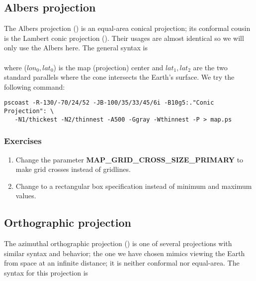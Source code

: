 \documentclass{report}
\begin{document}
\subsection{Albers projection}

The Albers projection () is an equal-area conical projection;
its conformal cousin is the Lambert conic projection ().
Their usages are almost identical so we will only use the Albers here.
The general syntax is \\

 \\

\noindent
where ($lon_0, lat_0$) is the map (projection) center and $lat_1, lat_2$
are the two standard parallels where the cone intersects the Earth's surface.
We try the following command:

{\small\begin{verbatim}
pscoast -R-130/-70/24/52 -JB-100/35/33/45/6i -B10g5:."Conic Projection": \
   -N1/thickest -N2/thinnest -A500 -Ggray -Wthinnest -P > map.ps
\end{verbatim}
}

\subsubsection{Exercises}

\begin{enumerate}

\item Change the parameter \textbf{MAP\_GRID\_CROSS\_SIZE\_PRIMARY} to make grid crosses instead of gridlines.

\item Change  to a rectangular box specification instead of
minimum and maximum values.

\end{enumerate}

\subsection{Orthographic projection}

The azimuthal orthographic projection () is one of several
projections with similar syntax and behavior; the one we have
chosen mimics viewing the Earth from space at an infinite distance;
it is neither conformal nor equal-area.
The syntax for this projection is \\
\end{document}
